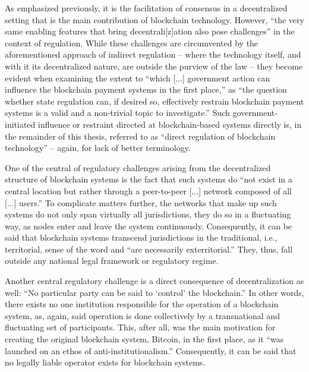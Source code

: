 As emphasized previously, it is the facilitation of consensus in a decentralized setting that is the main contribution of blockchain technology.
However, ``the very same enabling features that bring decentrali[z]ation also pose challenges'' in the context of regulation. \autocite[209]{ellul2020}
While these challenges are circumvented by the aforementioned approach of indirect regulation -- where the technology itself, and with it its decentralized nature, are outside the purview of the law -- they become evident when examining the extent to ``which [...] government action can influence the blockchain payment systems in the first place,'' as ``the question whether state regulation can, if desired so, effectively restrain blockchain payment systems is a valid and a non-trivial topic to investigate.'' \autocite[2]{shanaev2019}
Such government-initiated influence or restraint directed at blockchain-based systems directly is, in the remainder of this thesis, referred to as ``direct regulation of blockchain technology'' --  again, for lack of better terminology.

One of the central of regulatory challenges arising from the decentralized structure of blockchain systems is the fact that such systems do ``not exist in a central location but rather through a peer-to-peer [...] network composed of all [...] users.'' \autocite[1128]{tsukerman2015}
To complicate matters further, the networks that make up such systems do not only span virtually all jurisdictions, they do so in a fluctuating way, as nodes enter and leave the system continuously.
Consequently, it can be said that blockchain systems transcend jurisdictions in the traditional, i.e., territorial, sense of the word and ``are necessarily exterritorial.'' \autocite[2]{shanaev2019}
They, thus, fall outside any national legal framework or regulatory regime.

Another central regulatory challenge is a direct consequence of decentralization as well:
``No particular party can be said to `control' the blockchain.'' \autocite[1129]{tsukerman2015}
In other words, there exists no one institution responsible for the operation of a blockchain system, as, again, said operation is done collectively by a transnational and fluctuating set of participants.
This, after all, was the main motivation for creating the original blockchain system, Bitcoin, in the first place, as it ``was launched on an ethos of anti-institutionalism.'' \autocite[6]{yeoh2017}
Consequently, it can be said that no legally liable operator exists for blockchain systems.

